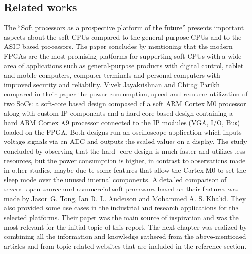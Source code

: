 \subsection{Related works}
\hspace{0.5cm} The “Soft processors as a prospective platform of the future” presents important aspects
about the soft CPUs compared to the general-purpose CPUs and to the ASIC based
processors. The paper concludes by mentioning that the modern FPGAs are the most
promising platforms for supporting soft CPUs with a wide area of applications such as
general-purpose products with digital control, tablet and mobile computers, computer
terminals and personal computers with improved security and reliability. Vivek Jayakrishnan
and Chirag Parikh compared in their paper \cite{Jayakrishnan2019} the power consumption, speed and resource
utilization of two SoCs: a soft-core based design composed of a soft ARM Cortex M0
processor along with custom IP components and a hard-core based design containing a hard
ARM Cortex A9 processor connected to the IP modules (VGA, I/O, Bus) loaded on the
FPGA. Both designs run an oscilloscope application which inputs voltage signals via an ADC
and outputs the scaled values on a display. The study concluded by observing that the hard-
core design is much faster and utilizes less resources, but the power consumption is higher, in
contrast to observations made in other studies, maybe due to some features that allow the
Cortex M0 to set the sleep mode over the unused internal components. A detailed comparison
of several open-source and commercial soft processors based on their features was made by
Jason G. Tong, Ian D. L. Anderson and Mohammed A. S. Khalid. They also provided some
use cases in the industrial and research applications for the selected platforms. Their paper
was the main source of inspiration and was the most relevant for the initial topic of this
report.
The next chapter was realized by combining all the information and knowledge gathered
from the above-mentioned articles and from topic related websites that are included in the
reference section.
